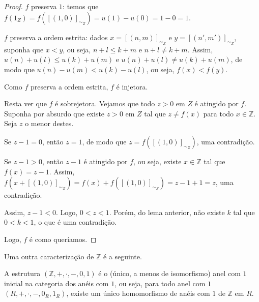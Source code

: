 \begin{proof}
    $f$ preserva $1$: temos que $f(1_Z)=f([(1, 0)]_{\sim_Z})=u(1)-u(0)=1-0=1$.

    $f$ preserva a ordem estrita: dados $x=[(n, m)]_{\sim_Z}$ e $y=[(n', m')]_{\sim_Z}$, suponha que $x<y$, ou seja, $n+l\leq k+m$ e $n+l\neq k+m$.
    Assim, $u(n)+u(l)\leq u(k)+u(m)$ e $u(n)+u(l)\neq u(k)+u(m)$, de modo que $u(n)-u(m)<u(k)-u(l)$, ou seja, $f(x)<f(y)$.

    Como $f$ preserva a ordem estrita, $f$ é injetora.

    Resta ver que $f$ é sobrejetora.
    Vejamos que todo $z>0$ em $Z$ é atingido por $f$.
    Suponha por absurdo que existe $z>0$ em $Z$ tal que $z\neq f(x)$ para todo $x\in \mathbb Z$.
    Seja $z$ o menor destes.

    Se $z-1=0$, então $z=1$, de modo que $z=f([(1, 0)]_{\sim_Z})$, uma contradição.

    Se $z-1>0$, então $z-1$ é atingido por $f$, ou seja, existe $x\in \mathbb Z$ tal que $f(x)=z-1$.
    Assim, $f(x+[(1, 0)]_{\sim_Z})=f(x)+f([(1, 0)]_{\sim_Z})=z-1+1=z$, uma contradição.

    Assim, $z-1<0$.
    Logo, $0<z<1$.
    Porém, do lema anterior, não existe $k$ tal que $0<k<1$, o que é uma contradição.

    Logo, $f$ é como queríamos.
\end{proof}

Uma outra caracterização de $\mathbb Z$ é a seguinte.

\begin{theorem}
   A estrutura $(\mathbb Z, +, \cdot, -, 0, 1)$ é o (único, a menos de isomorfismo) anel com $1$ inicial na categoria dos anéis com $1$, ou seja, para todo anel com $1$ $(R, +, \cdot, -, 0_R, 1_R)$, existe um único homomorfismo de anéis com $1$ de $\mathbb Z$ em $R$.
\end{theorem}

